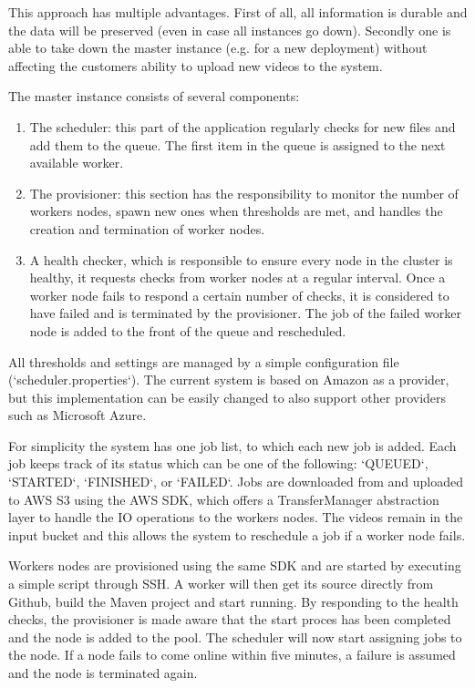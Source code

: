\documentclass[a4paper]{IEEEtran}
\begin{document}
This approach has multiple advantages.
First of all, all information is durable and the data will be preserved (even in case all instances go down).
Secondly one is able to take down the master instance (e.g. for a new deployment) without affecting the customers ability to upload new videos to the system.

The master instance consists of several components:

\begin{enumerate}
\item
The scheduler:
this part of the application regularly checks for new files and add them to the queue.
The first item in the queue is assigned to the next available worker.
\item
The provisioner:
this section has the responsibility to monitor the number of workers nodes, spawn new ones when thresholds are met, and handles the creation and termination of worker nodes.
\item
A health checker, which is responsible to ensure every node in the cluster is healthy, it requests checks from worker nodes at a regular interval.
Once a worker node fails to respond a certain number of checks, it is considered to have failed and is terminated by the provisioner.
The job of the failed worker node is added to the front of the queue and rescheduled.
\end{enumerate}

All thresholds and settings are managed by a simple configuration file (`scheduler.properties`).
The current system is based on Amazon as a provider, but this implementation can be easily changed to also support other providers such as Microsoft Azure.

For simplicity the system has one job list, to which each new job is added.
Each job keeps track of its status which can be one of the following: `QUEUED`, `STARTED`, `FINISHED`, or `FAILED`.
Jobs are downloaded from and uploaded to AWS S3 using the AWS SDK, which offers a TransferManager abstraction layer to handle the IO operations to the workers nodes.
The videos remain in the input bucket and this allows the system to reschedule a job if a worker node fails.

Workers nodes are provisioned using the same SDK and are started by executing a simple script through SSH.
A worker will then get its source directly from Github, build the Maven project and start running.
By responding to the health checks, the provisioner is made aware that the start proces has been completed and the node is added to the pool. 
The scheduler will now start assigning jobs to the node.
If a node fails to come online within five minutes, a failure is assumed and the node is terminated again.
\end{document}
